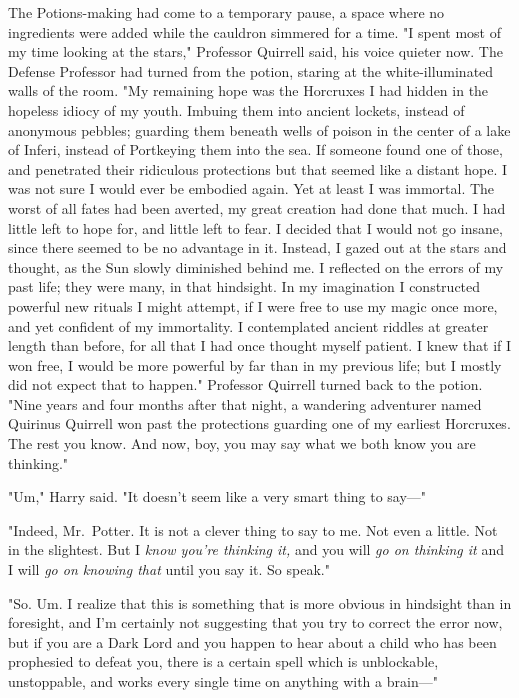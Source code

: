 The Potions-making had come to a temporary pause, a space where no ingredients
were added while the cauldron simmered for a time. "I spent most of my time
looking at the stars," Professor Quirrell said, his voice quieter now. The
Defense Professor had turned from the potion, staring at the white-illuminated
walls of the room. "My remaining hope was the Horcruxes I had hidden in the
hopeless idiocy of my youth. Imbuing them into ancient lockets, instead of
anonymous pebbles; guarding them beneath wells of poison in the center of a
lake of Inferi, instead of Portkeying them into the sea. If someone found one
of those, and penetrated their ridiculous protections{\el} but that seemed
like a distant hope. I was not sure I would ever be embodied again. Yet at
least I was immortal. The worst of all fates had been averted, my great
creation had done that much. I had little left to hope for, and little left to
fear. I decided that I would not go insane, since there seemed to be no
advantage in it. Instead, I gazed out at the stars and thought, as the Sun
slowly diminished behind me. I reflected on the errors of my past life; they
were many, in that hindsight. In my imagination I constructed powerful new
rituals I might attempt, if I were free to use my magic once more, and yet
confident of my immortality. I contemplated ancient riddles at greater length
than before, for all that I had once thought myself patient. I knew that if I
won free, I would be more powerful by far than in my previous life; but I
mostly did not expect that to happen." Professor Quirrell turned back to the
potion. "Nine years and four months after that night, a wandering adventurer
named Quirinus Quirrell won past the protections guarding one of my earliest
Horcruxes. The rest you know. And now, boy, you may say what we both know you
are thinking."

"Um," Harry said. "It doesn't seem like a very smart thing to say\mbox{---}"

"Indeed, Mr.~Potter. It is not a clever thing to say to me. Not even a little.
Not in the slightest. But I \emph{know you're thinking it,} and you will
\emph{go on thinking it} and I will \emph{go on knowing that} until you say it.
So speak."

"So. Um. I realize that this is something that is more obvious in hindsight
than in foresight, and I'm certainly not suggesting that you try to correct the
error now, but if you are a Dark Lord and you happen to hear about a child who
has been prophesied to defeat you, there is a certain spell which is
unblockable, unstoppable, and works every single time on anything with a
brain\mbox{---}"

